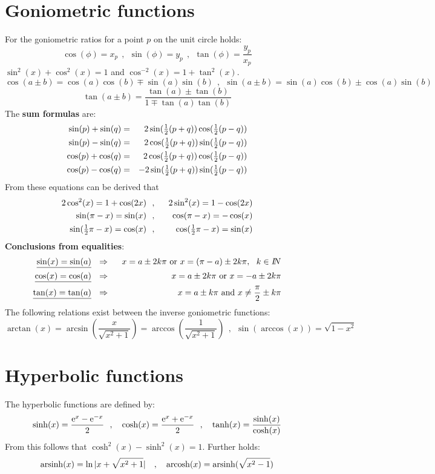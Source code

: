 \documentclass[a4paper,fancyheadings,twoside]{report}
\begin{document}
\section{Goniometric functions}
For the goniometric ratios for a point $p$ on the unit circle holds:
\[
\cos(\phi)=x_p~~,~~\sin(\phi)=y_p~~,~~\tan(\phi)=\frac{y_p}{x_p}
\]
$\sin^2(x)+\cos^2(x)=1$ and $\cos^{-2}(x)=1+\tan^2(x)$.
\[
\cos(a\pm b)=\cos(a)\cos(b)\mp\sin(a)\sin(b)~~,~~
\sin(a\pm b)=\sin(a)\cos(b)\pm\cos(a)\sin(b)
\]
\[
\tan(a\pm b)=\frac{\tan(a)\pm\tan(b)}{1\mp\tan(a)\tan(b)}
\]
The {\bf sum formulas} are:
\begin{eqnarray*}
\sin(p)+\sin(q)&=&2\sin(\mbox{$\frac{1}{2}$}(p+q))\cos(\mbox{$\frac{1}{2}$}(p-q))\\
\sin(p)-\sin(q)&=&2\cos(\mbox{$\frac{1}{2}$}(p+q))\sin(\mbox{$\frac{1}{2}$}(p-q))\\
\cos(p)+\cos(q)&=&2\cos(\mbox{$\frac{1}{2}$}(p+q))\cos(\mbox{$\frac{1}{2}$}(p-q))\\
\cos(p)-\cos(q)&=&-2\sin(\mbox{$\frac{1}{2}$}(p+q))\sin(\mbox{$\frac{1}{2}$}(p-q))\\
\end{eqnarray*}
From these equations can be derived that
\begin{eqnarray*}
2\cos^2(x)=1+\cos(2x)   &~~,~~&2\sin^2(x)=1-\cos(2x)\\
\sin(\pi-x)=\sin(x)     &~~,~~&\cos(\pi-x)=-\cos(x)\\
\sin(\mbox{$\frac{1}{2}$}\pi-x)=\cos(x)&~~,~~&\cos(\mbox{$\frac{1}{2}$}\pi-x)=\sin(x)
\end{eqnarray*}
{\bf Conclusions from equalities}:
\begin{eqnarray*}
\underline{\sin(x)=\sin(a)}&~~\Rightarrow~~&x=a\pm2k\pi\mbox{ or }x=(\pi-a)\pm2k\pi,~~k\in I\hspace{-1mm}N\\
\underline{\cos(x)=\cos(a)}&~~\Rightarrow~~&x=a\pm2k\pi\mbox{ or }x=-a\pm2k\pi\\
\underline{\tan(x)=\tan(a)}&~~\Rightarrow~~&x=a\pm k\pi\mbox{ and }x\neq\frac{\pi}{2}\pm k\pi
\end{eqnarray*}
The following relations exist between the inverse goniometric functions:
\[
\arctan(x)=\arcsin\left(\frac{x}{\sqrt{x^2+1}}\right)=\arccos\left(\frac{1}{\sqrt{x^2+1}}\right)~~,~~
\sin(\arccos(x))=\sqrt{1-x^2}
\]

\section{Hyperbolic functions}
The hyperbolic functions are defined by:
\[
\sinh(x)=\frac{{\rm e}^x-{\rm e}^{-x}}{2}~~,~~~\cosh(x)=\frac{{\rm e}^x+{\rm e}^{-x}}{2}~~,~~~\tanh(x)=\frac{\sinh(x)}{\cosh(x)}
\]
From this follows that $\cosh^2(x)-\sinh^2(x)=1$. Further holds:
\[
{\rm arsinh}(x)=\ln|x+\sqrt{x^2+1}|~~~,~~~{\rm arcosh}(x)={\rm arsinh}(\sqrt{x^2-1})
\]
\end{document}
